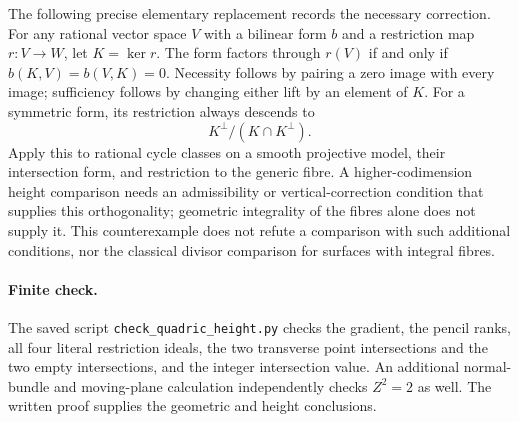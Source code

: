The following precise elementary replacement records the necessary
correction. For any rational vector space $V$ with a bilinear form
$b$ and a restriction map $r:V\to W$, let $K=\ker r$.
The form factors through $r(V)$ if and only if
$b(K,V)=b(V,K)=0$. Necessity follows by pairing a zero image with
every image; sufficiency follows by changing either lift by an
element of $K$. For a symmetric form, its restriction always
descends to
\[
                K^\perp/(K\cap K^\perp).
\]
Apply this to rational cycle classes on a smooth projective model,
their intersection form, and restriction to the generic fibre.
A higher-codimension height comparison needs an admissibility or
vertical-correction condition that supplies this orthogonality;
geometric integrality of the fibres alone does not supply it.
This counterexample does not refute a comparison with such
additional conditions, nor the classical divisor comparison for
surfaces with integral fibres.

\paragraph{Finite check.}
The saved script \texttt{check\_quadric\_height.py} checks the
gradient, the pencil ranks, all four literal restriction ideals,
the two transverse point intersections and the two empty intersections,
and the integer intersection value. An additional normal-bundle and
moving-plane calculation independently checks $Z^2=2$ as well.
The written proof supplies the geometric and height conclusions.

